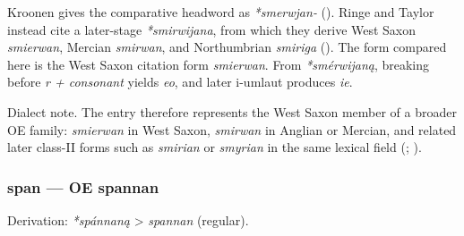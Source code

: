 \documentclass[
  british,
  a4paper,
]{article}
\begin{document}
Kroonen gives the comparative headword as \emph{*smerwjan-}
(). Ringe and Taylor
instead cite a later-stage \emph{*smirwijana}, from which they derive
West Saxon \emph{smierwan}, Mercian \emph{smirwan}, and Northumbrian
\emph{smiriga} (). The form compared here is the West Saxon citation form
\emph{smierwan}. From \emph{*smérwijaną}, breaking before \emph{r +
consonant} yields \emph{eo}, and later i-umlaut produces \emph{ie}.

Dialect note. The entry therefore represents the West Saxon member of a
broader OE family: \emph{smierwan} in West Saxon, \emph{smirwan} in
Anglian or Mercian, and related later class-II forms such as
\emph{smirian} or \emph{smyrian} in the same lexical field
(;
).

\subsubsection{span --- OE spannan}\label{span-oe-spannan}

Derivation: \emph{*spánnaną} \textgreater{} \emph{spannan} (regular).

\begingroup
\setlength{\fboxsep}{6pt}
\end{document}
